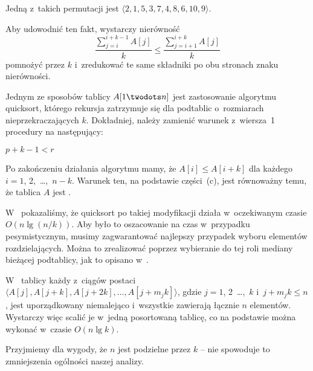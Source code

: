 \subproblem %
Jedną z~takich permutacji jest $\langle2,1,5,3,7,4,8,6,10,9\rangle$.

\subproblem %
Aby udowodnić ten fakt, wystarczy nierówność
\[
	\frac{\sum_{j=i}^{i+k-1}A[j]}{k} \le \frac{\sum_{j=i+1}^{i+k}A[j]}{k}
\]
pomnożyć przez $k$ i~zredukować te same składniki po obu stronach znaku nierówności.

\subproblem %
Jednym ze sposobów  tablicy $A[1\twodots n]$ jest zastosowanie algorytmu quicksort, którego rekursja zatrzymuje się dla podtablic o~rozmiarach nieprzekraczających $k$. Dokładniej, należy zamienić warunek z~wiersza~1 procedury  na następujący:
\begin{codebox}
\li	\If $p+k-1<r$
\end{codebox}
Po zakończeniu działania algorytmu mamy, że $A[i]\le A[i+k]$ dla każdego $i=1$, 2,~\dots,~$n-k$. Warunek ten, na podstawie części~(c), jest równoważny temu, że tablica $A$ jest .

W~ pokazaliśmy, że quicksort po takiej modyfikacji działa w~oczekiwanym czasie $O(n\lg(n/k))$. Aby było to oszacowanie na czas w~przypadku pesymistycznym, musimy zagwarantować najlepszy przypadek wyboru elementów rozdzielających. Można to zrealizować poprzez wybieranie do tej roli mediany bieżącej podtablicy, jak to opisano w~.

\subproblem %
W~ tablicy każdy z~ciągów postaci $\langle A[j],A[j+k],A[j+2k],\dots,A[j+m_jk]\rangle$, gdzie $j=1$, 2~\dots,~$k$ i~$j+m_jk\le n$, jest uporządkowany niemalejąco i~wszystkie zawierają łącznie $n$ elementów. Wystarczy więc scalić je w~jedną posortowaną tablicę, co na podstawie  można wykonać w~czasie $O(n\lg k)$.

\subproblem %
Przyjmiemy dla wygody, że $n$ jest podzielne przez $k$ -- nie spowoduje to zmniejszenia ogólności naszej analizy.


